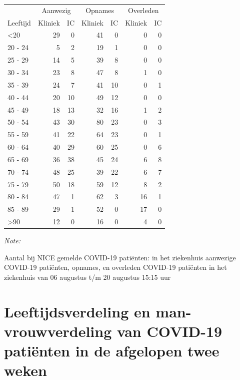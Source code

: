 \documentclass[
  english,
  man,floatsintext]{apa6}
\begin{document}
\begin{table}
\centering\begingroup\fontsize{10}{12}\selectfont

\begin{threeparttable}
\begin{tabular}{lrrrrrr}
\toprule
\multicolumn{1}{c}{ } & \multicolumn{2}{c}{Aanwezig} & \multicolumn{2}{c}{Opnames} & \multicolumn{2}{c}{Overleden} \\
\cmidrule(l{3pt}r{3pt}){2-3} \cmidrule(l{3pt}r{3pt}){4-5} \cmidrule(l{3pt}r{3pt}){6-7}
Leeftijd & Kliniek & IC & Kliniek & IC & Kliniek & IC\\
\midrule
<20 & 29 & 0 & 41 & 0 & 0 & 0\\
20 - 24 & 5 & 2 & 19 & 1 & 0 & 0\\
25 - 29 & 14 & 5 & 39 & 8 & 0 & 0\\
30 - 34 & 23 & 8 & 47 & 8 & 1 & 0\\
35 - 39 & 24 & 7 & 41 & 10 & 0 & 1\\
40 - 44 & 20 & 10 & 49 & 12 & 0 & 0\\
45 - 49 & 18 & 13 & 32 & 16 & 1 & 2\\
50 - 54 & 43 & 30 & 80 & 23 & 0 & 3\\
55 - 59 & 41 & 22 & 64 & 23 & 0 & 1\\
60 - 64 & 40 & 29 & 60 & 25 & 0 & 6\\
65 - 69 & 36 & 38 & 45 & 24 & 6 & 8\\
70 - 74 & 48 & 25 & 39 & 22 & 6 & 7\\
75 - 79 & 50 & 18 & 59 & 12 & 8 & 2\\
80 - 84 & 47 & 1 & 62 & 3 & 16 & 1\\
85 - 89 & 29 & 1 & 52 & 0 & 17 & 0\\
>90 & 12 & 0 & 16 & 0 & 4 & 0\\
\bottomrule
\end{tabular}
\begin{tablenotes}
\item \textit{Note: } 
\item Aantal bij NICE gemelde COVID-19 patiënten: in het ziekenhuis aanwezige COVID-19 patiënten, opnames, en overleden COVID-19 patiënten in het ziekenhuis van 06 augustus t/m 20 augustus 15:15 uur
\end{tablenotes}
\end{threeparttable}
\endgroup{}
\end{table}

\newpage

\hypertarget{leeftijdsverdeling-en-man-vrouwverdeling-van-covid-19-patiuxebnten-in-de-afgelopen-twee-weken}{%
\section{Leeftijdsverdeling en man-vrouwverdeling van COVID-19 patiënten in de afgelopen twee weken}\label{leeftijdsverdeling-en-man-vrouwverdeling-van-covid-19-patiuxebnten-in-de-afgelopen-twee-weken}}
\end{document}
